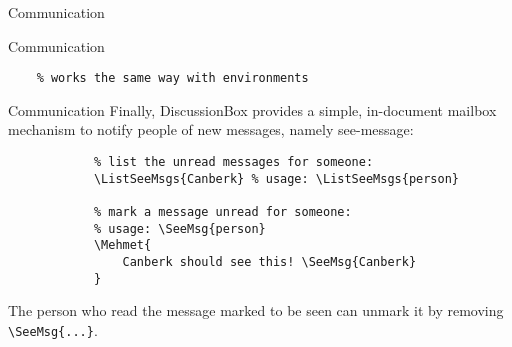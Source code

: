 \documentclass{article}
\begin{document}
\begin{discussionbox}
\begin{dboxmsg}{Communication}
\begin{dboxmsg}{Communication}
\begin{verbatim}
    % works the same way with environments
            \end{verbatim}
        \end{dboxmsg}
    \end{dboxmsg}

    \begin{dboxmsg}{Communication}
        Finally, DiscussionBox provides a simple, in-document mailbox mechanism to notify people of new messages, namely see-message:

        \begin{verbatim}
            % list the unread messages for someone:
            \ListSeeMsgs{Canberk} % usage: \ListSeeMsgs{person}

            % mark a message unread for someone:
            % usage: \SeeMsg{person}
            \Mehmet{
                Canberk should see this! \SeeMsg{Canberk}
            }
        \end{verbatim}

        The person who read the message marked to be seen can unmark it by removing \verb|\SeeMsg{...}|.
    \end{dboxmsg}
\end{discussionbox}
\end{document}
